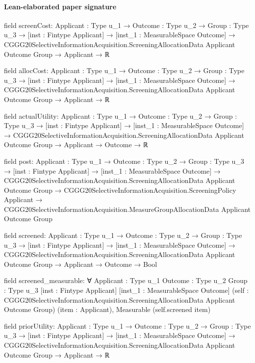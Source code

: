 \documentclass[10pt]{article}
\begin{document}
\paragraph{Lean-elaborated paper signature}
\begin{ReviewVerbatim}
field screenCost:
{Applicant : Type u_1} →
  {Outcome : Type u_2} →
    {Group : Type u_3} →
      [inst : Fintype Applicant] →
        [inst_1 : MeasurableSpace Outcome] →
          CGGG20SelectiveInformationAcquisition.ScreeningAllocationData Applicant Outcome Group → Applicant → ℝ

field allocCost:
{Applicant : Type u_1} →
  {Outcome : Type u_2} →
    {Group : Type u_3} →
      [inst : Fintype Applicant] →
        [inst_1 : MeasurableSpace Outcome] →
          CGGG20SelectiveInformationAcquisition.ScreeningAllocationData Applicant Outcome Group → Applicant → ℝ

field actualUtility:
{Applicant : Type u_1} →
  {Outcome : Type u_2} →
    {Group : Type u_3} →
      [inst : Fintype Applicant] →
        [inst_1 : MeasurableSpace Outcome] →
          CGGG20SelectiveInformationAcquisition.ScreeningAllocationData Applicant Outcome Group →
            Applicant → Outcome → ℝ

field post:
{Applicant : Type u_1} →
  {Outcome : Type u_2} →
    {Group : Type u_3} →
      [inst : Fintype Applicant] →
        [inst_1 : MeasurableSpace Outcome] →
          CGGG20SelectiveInformationAcquisition.ScreeningAllocationData Applicant Outcome Group →
            CGGG20SelectiveInformationAcquisition.ScreeningPolicy Applicant →
              CGGG20SelectiveInformationAcquisition.MeasureGroupAllocationData Applicant Outcome Group

field screened:
{Applicant : Type u_1} →
  {Outcome : Type u_2} →
    {Group : Type u_3} →
      [inst : Fintype Applicant] →
        [inst_1 : MeasurableSpace Outcome] →
          CGGG20SelectiveInformationAcquisition.ScreeningAllocationData Applicant Outcome Group →
            Applicant → Outcome → Bool

field screened_measurable:
∀ {Applicant : Type u_1} {Outcome : Type u_2} {Group : Type u_3} [inst : Fintype Applicant]
  [inst_1 : MeasurableSpace Outcome]
  (self : CGGG20SelectiveInformationAcquisition.ScreeningAllocationData Applicant Outcome Group) (item : Applicant),
  Measurable (self.screened item)

field priorUtility:
{Applicant : Type u_1} →
  {Outcome : Type u_2} →
    {Group : Type u_3} →
      [inst : Fintype Applicant] →
        [inst_1 : MeasurableSpace Outcome] →
          CGGG20SelectiveInformationAcquisition.ScreeningAllocationData Applicant Outcome Group → Applicant → ℝ


\end{ReviewVerbatim}
\end{document}
